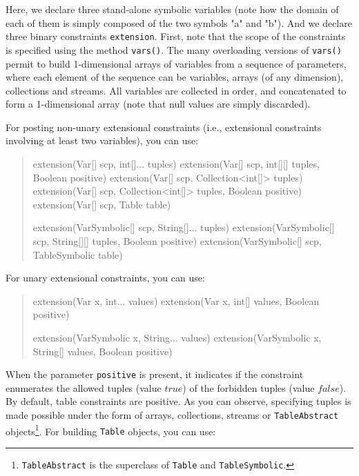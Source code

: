 \documentclass[10pt]{article}
\newcommand{\gb}[1]{{\tt #1}} %
\newcommand{\nn}[1]{{\tt #1}} %
\newenvironment{myvb}{\endgraf\small\verbatim}{\endverbatim}
\begin{document}
Here, we declare three stand-alone symbolic variables (note how the domain of each of them is simply composed of the two symbols "a" and "b").
And we declare three binary constraints \gb{extension}. First, note that the scope of the constraints is specified using the method \nn{vars()}.
The many overloading versions of \nn{vars()} permit to build 1-dimensional arrays of variables from a sequence of parameters, where each element of the sequence can be variables, arrays (of any dimension), collections and streams.
All variables are collected in order, and concatenated to form a 1-dimensional array (note that null values are simply discarded).

For posting non-unary extensional constraints (i.e., extensional constraints involving at least two variables), you can use:

\begin{quote}
\begin{myvb}
extension(Var[] scp, int[]... tuples)
extension(Var[] scp, int[][] tuples, Boolean positive) 
extension(Var[] scp, Collection<int[]> tuples)
extension(Var[] scp, Collection<int[]> tuples, Boolean positive) 
extension(Var[] scp, Table table) 

extension(VarSymbolic[] scp, String[]... tuples)
extension(VarSymbolic[] scp, String[][] tuples, Boolean positive) 
extension(VarSymbolic[] scp, TableSymbolic table) 
\end{myvb}
\end{quote}

For unary extensional constraints, you can use:

\begin{quote}
\begin{myvb}
extension(Var x, int... values)
extension(Var x, int[] values, Boolean positive) 

extension(VarSymbolic x, String... values)
extension(VarSymbolic x, String[] values, Boolean positive) 
\end{myvb}
\end{quote}
When the parameter \nn{positive} is present, it indicates if the constraint enumerates the allowed tuples (value $true$) of the forbidden tuples (value $false$).
By default, table constraints are positive.
As you can observe, specifying tuples is made possible under the form of arrays, collections, streams or \nn{TableAbstract} objects\footnote{\nn{TableAbstract} is the superclass of \nn{Table} and \nn{TableSymbolic}.}.
For building \nn{Table} objects, you can use: 
\end{document}

